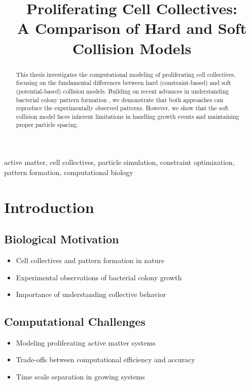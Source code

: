 \documentclass[conference]{IEEEtran}
\begin{document}
\title{Proliferating Cell Collectives: \\A Comparison of Hard and Soft Collision Models}

\author{
}

\maketitle

\begin{abstract}
    This thesis investigates the computational modeling of proliferating cell collectives, focusing on the fundamental differences between hard (constraint-based) and soft (potential-based) collision models. Building on recent advances in understanding bacterial colony pattern formation \cite{Weady2024}, we demonstrate that both approaches can reproduce the experimentally observed patterns. However, we show that the soft collision model faces inherent limitations in handling growth events and maintaining proper particle spacing.

\end{abstract}

\begin{IEEEkeywords}
    active matter, cell collectives, particle simulation, constraint optimization, pattern formation, computational biology
\end{IEEEkeywords}


\section{Introduction}
\subsection{Biological Motivation}
\begin{itemize}
    \item Cell collectives and pattern formation in nature
    \item Experimental observations of bacterial colony growth
    \item Importance of understanding collective behavior
\end{itemize}

\newpage

\subsection{Computational Challenges}
\begin{itemize}
    \item Modeling proliferating active matter systems
    \item Trade-offs between computational efficiency and accuracy
    \item Time scale separation in growing systems
\end{itemize}
\end{document}
